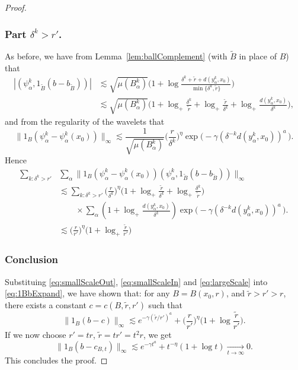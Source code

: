 \documentclass{amsart}
\numberwithin{equation}{section}
\theoremstyle{plain}
\theoremstyle{definition}
\theoremstyle{remark}
\begin{document}
{{{\begin{proof}
\subsubsection*{Part $\delta^k> r'$.}
As before, we have from Lemma~\ref{lem:ballComplement} (with $\tilde{B}$ in place of $B$) that
\begin{equation*}
\begin{split}
  {|{(\psi^k_\alpha,1_{\tilde{B}}(b-b_{\tilde{B}}))}|}
  &\lesssim\sqrt{\mu(B^k_\alpha)}\Big(1+\log\frac{\delta^k+\tilde{r}+d(y^k_\alpha,x_0)}{\min\{\delta^k,\tilde{r}\}}\Big) \\
  &\lesssim\sqrt{\mu(B^k_\alpha)}\Big(1+\log_+\frac{\delta^k}{\tilde{r}}+\log_+\frac{\tilde{r}}{\delta^k}+\log_+\frac{d(y^k_\alpha,x_0)}{\delta^k}\Big),
\end{split}
\end{equation*}
and from the regularity of the wavelets that
\begin{equation*}
  {\|{1_B(\psi^k_\alpha-\psi^k_\alpha(x_0))}\|_{{\infty}}}
  \lesssim\frac{1}{\sqrt{\mu(B^k_\alpha)}}\Big(\frac{r}{\delta^k}\Big)^{\eta}\exp\big(-\gamma(\delta ^{-k}{d(y^k_\alpha,x_0)})^a \, \big).
\end{equation*}
Hence
\begin{equation}\label{eq:largeScale}
\begin{split}
  \sum_{k:\delta^k> r'}&\sum_{\alpha}{\|{1_B(\psi^k_\alpha-\psi^k_\alpha(x_0))(\psi^k_\alpha,1_{\tilde{B}}(b-b_{\tilde{B}}))}\|_{{\infty}}} \\
  &\lesssim  \sum_{k:\delta^k> r'}\Big(\frac{r}{\delta^k}\Big)^{\eta}\Big(1+\log_+\frac{\tilde{r}}{\delta^k}+\log_+\frac{\delta^k}{\tilde{r}}\Big) \\
  &\qquad\times\sum_{\alpha}(1+\log_+\frac{d(y^k_\alpha,x_0)}{\delta^k})\exp\big(-\gamma(\delta ^{-k}{d(y^k_\alpha,x_0)})^a \, \big).
   \\
  &\lesssim \Big(\frac{r}{r'}\Big)^{\eta}\Big(1+\log_+\frac{\tilde{r}}{r'}\Big)
\end{split}
\end{equation}

\subsubsection*{Conclusion}
Substituing \eqref{eq:smallScaleOut}, \eqref{eq:smallScaleIn} and \eqref{eq:largeScale} into \eqref{eq:1BbExpand}, we have shown that: for any $B=B(x_0,r)$, and $\tilde{r}>r'>r$, there exists a constant $c=c(B,\tilde{r},r')$ such that
\begin{equation*}
  {\|{1_B(b-c)}\|_{{\infty}}}\lesssim e^{-\gamma(\tilde{r}/r')^a}+\Big(\frac{r}{r'}\Big)^{\eta}\Big(1+\log\frac{\tilde{r}}{r'}\Big).
\end{equation*}
If we now choose $r'=tr$, $\tilde{r}=tr'=t^2 r$, we get
\begin{equation*}
  {\|{1_B(b-c_{B,t})}\|_{{\infty}}}\lesssim e^{-\gamma t^a}+t^{-\eta}(1+\log t)\underset{t\to\infty}{\longrightarrow} 0.
\end{equation*}
This concludes the proof.
\end{proof}
  
}}}
\end{document}
